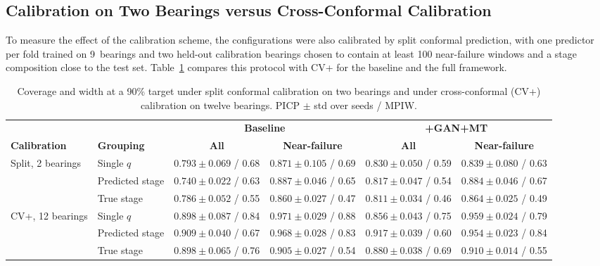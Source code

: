 \documentclass[review]{elsarticle}
\begin{document}
\subsection{Calibration on Two Bearings versus Cross-Conformal Calibration}
\label{sec:res_calibration}

To measure the effect of the calibration scheme, the configurations
were also calibrated by split conformal prediction, with one predictor
per fold trained on 9~bearings and two held-out calibration bearings
chosen to contain at least 100 near-failure windows and a stage
composition close to the test set. Table~\ref{tab:calibration}
compares this protocol with CV+ for the baseline and the full
framework.

\begin{table}[!htbp]
\centering
\caption{Coverage and width at a 90\% target under split conformal
calibration on two bearings and under cross-conformal (CV+)
calibration on twelve bearings. PICP $\pm$ std over seeds / MPIW.}
\label{tab:calibration}
\scriptsize
\renewcommand{\arraystretch}{1.2}
\setlength{\tabcolsep}{4pt}
\begin{tabular}{llcccc}
\toprule
& & \multicolumn{2}{c}{\textbf{Baseline}} & \multicolumn{2}{c}{\textbf{+GAN+MT}} \\
\cmidrule(lr){3-4}\cmidrule(lr){5-6}
\textbf{Calibration} & \textbf{Grouping} & \textbf{All} & \textbf{Near-failure} & \textbf{All} & \textbf{Near-failure} \\
\midrule
\multirow{3}{*}{Split, 2 bearings}
 & Single $q$        & $0.793 \pm 0.069$ / 0.68 & $0.871 \pm 0.105$ / 0.69 & $0.830 \pm 0.050$ / 0.59 & $0.839 \pm 0.080$ / 0.63 \\
 & Predicted stage   & $0.740 \pm 0.022$ / 0.63 & $0.887 \pm 0.046$ / 0.65 & $0.817 \pm 0.047$ / 0.54 & $0.884 \pm 0.046$ / 0.67 \\
 & True stage        & $0.786 \pm 0.052$ / 0.55 & $0.860 \pm 0.027$ / 0.47 & $0.811 \pm 0.034$ / 0.46 & $0.864 \pm 0.025$ / 0.49 \\
\midrule
\multirow{3}{*}{CV+, 12 bearings}
 & Single $q$        & $0.898 \pm 0.087$ / 0.84 & $0.971 \pm 0.029$ / 0.88 & $0.856 \pm 0.043$ / 0.75 & $0.959 \pm 0.024$ / 0.79 \\
 & Predicted stage   & $\mathbf{0.909 \pm 0.040}$ / 0.67 & $0.968 \pm 0.028$ / 0.83 & $\mathbf{0.917 \pm 0.039}$ / 0.60 & $0.954 \pm 0.023$ / 0.84 \\
 & True stage        & $0.898 \pm 0.065$ / 0.76 & $0.905 \pm 0.027$ / 0.54 & $0.880 \pm 0.038$ / 0.69 & $0.910 \pm 0.014$ / 0.55 \\
\bottomrule
\end{tabular}
\end{table}
\end{document}
